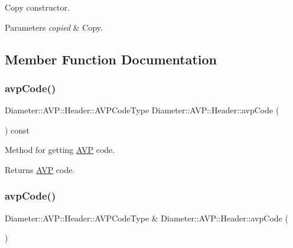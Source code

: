 Copy constructor. 


\begin{DoxyParams}{Parameters}
{\em copied} & Copy. \\
\hline
\end{DoxyParams}


\subsection{Member Function Documentation}
\mbox{\label{classDiameter_1_1AVP_1_1Header_a4cf4fb50efbf6e3f6de2b50b528ecc3b}} 
\subsubsection{\texorpdfstring{avp\+Code()}{avpCode()}\hspace{0.1cm}{\footnotesize\ttfamily [1/2]}}
{\footnotesize\ttfamily Diameter\+::\+A\+V\+P\+::\+Header\+::\+A\+V\+P\+Code\+Type Diameter\+::\+A\+V\+P\+::\+Header\+::avp\+Code (\begin{DoxyParamCaption}{ }\end{DoxyParamCaption}) const}



Method for getting \hyperlink{classDiameter_1_1AVP}{A\+VP} code. 

\begin{DoxyReturn}{Returns}
\hyperlink{classDiameter_1_1AVP}{A\+VP} code. 
\end{DoxyReturn}
\mbox{\label{classDiameter_1_1AVP_1_1Header_ad6b105892bcd3dcc952788299797bfa5}} 
\subsubsection{\texorpdfstring{avp\+Code()}{avpCode()}\hspace{0.1cm}{\footnotesize\ttfamily [2/2]}}
{\footnotesize\ttfamily Diameter\+::\+A\+V\+P\+::\+Header\+::\+A\+V\+P\+Code\+Type \& Diameter\+::\+A\+V\+P\+::\+Header\+::avp\+Code (\begin{DoxyParamCaption}{ }\end{DoxyParamCaption})}



